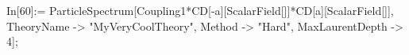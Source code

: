 In[60]:= ParticleSpectrum[Coupling1*CD[-a][ScalarField[]]*CD[a][ScalarField[]], TheoryName -> "MyVeryCoolTheory", Method -> "Hard", MaxLaurentDepth -> 4]; 